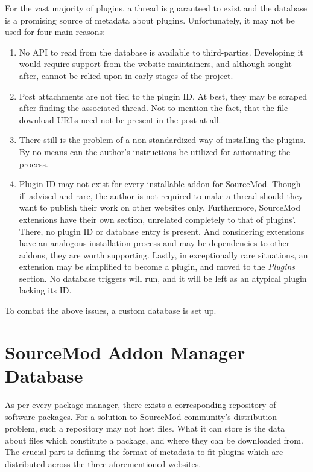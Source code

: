 For the vast majority of plugins, a thread is guaranteed to exist and the database is a promising source of metadata about plugins.
Unfortunately, it may not be used for four main reasons:
\begin{enumerate}
\item
No API to read from the database is available to third-parties.
Developing it would require support from the website maintainers, and although sought after, cannot be relied upon in early stages of the project.
\item
Post attachments are not tied to the plugin ID.
At best, they may be scraped after finding the associated thread.
Not to mention the fact, that the file download URLs need not be present in the post at all.
\item
There still is the problem of a non standardized way of installing the plugins.
By no means can the author's instructions be utilized for automating the process.
\item
Plugin ID may not exist for every installable addon for SourceMod.
Though ill-advised and rare, the author is not required to make a thread should they want to publish their work on other websites only.
Furthermore, SourceMod extensions have their own section, unrelated completely to that of plugins'.
There, no plugin ID or database entry is present.
And considering extensions have an analogous installation process and may be dependencies to other addons, they are worth supporting.
Lastly, in exceptionally rare situations, an extension may be simplified to become a plugin, and moved to the \textit{Plugins} section.
No database triggers will run, and it will be left as an atypical plugin lacking its ID.
\end{enumerate}

To combat the above issues, a custom database is set up.

\section{SourceMod Addon Manager Database}

As per every package manager, there exists a corresponding repository of software packages.
For a solution to SourceMod community's distribution problem, such a repository may not host files.
What it can store is the data about files which constitute a package, and where they can be downloaded from.
The crucial part is defining the format of metadata to fit plugins which are distributed across the three aforementioned websites.


